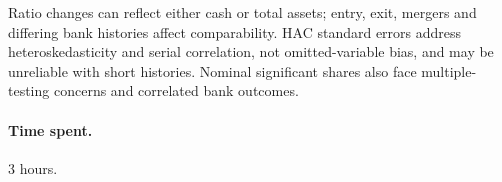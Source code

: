 \documentclass[10pt]{article}
\begin{document}
Ratio changes can reflect either cash or total assets; entry, exit, mergers and differing bank histories affect comparability. HAC standard errors address heteroskedasticity and serial correlation, not omitted-variable bias, and may be unreliable with short histories. Nominal significant shares also face multiple-testing concerns and correlated bank outcomes.

\paragraph{Time spent.} 3 hours.
\end{document}
